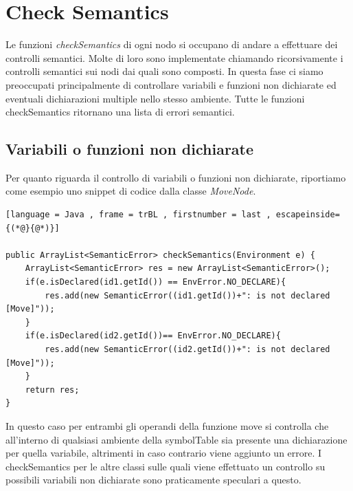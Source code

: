 \documentclass[12pt, a4paper]{report}
\begin{document}
 \section{Check Semantics}
 Le funzioni \emph{checkSemantics} di ogni nodo si occupano di andare a effettuare dei controlli semantici. Molte di loro sono implementate chiamando ricorsivamente i controlli semantici sui nodi dai quali sono composti. 
 In questa fase ci siamo preoccupati principalmente di controllare variabili e funzioni non dichiarate ed eventuali dichiarazioni multiple nello stesso ambiente. Tutte le funzioni checkSemantics ritornano una lista di errori semantici. 

 \subsection{Variabili o funzioni non dichiarate}
   Per quanto riguarda il controllo di variabili o funzioni non dichiarate, riportiamo come esempio uno snippet di codice dalla classe \emph{MoveNode}.
   \begin{lstlisting}[language = Java , frame = trBL , firstnumber = last , escapeinside={(*@}{@*)}]

public ArrayList<SemanticError> checkSemantics(Environment e) {
    ArrayList<SemanticError> res = new ArrayList<SemanticError>();
    if(e.isDeclared(id1.getId()) == EnvError.NO_DECLARE){
        res.add(new SemanticError((id1.getId())+": is not declared [Move]"));
    }
    if(e.isDeclared(id2.getId())== EnvError.NO_DECLARE){
        res.add(new SemanticError((id2.getId())+": is not declared [Move]"));
    }
    return res;
}
   \end{lstlisting}
   In questo caso per entrambi gli operandi della funzione move si controlla che all'interno di qualsiasi ambiente della symbolTable sia presente una dichiarazione per quella variabile, altrimenti in caso contrario viene aggiunto un errore. I checkSemantics per le altre classi sulle quali viene effettuato un controllo su possibili variabili non dichiarate sono praticamente speculari a questo. 
\end{document}
